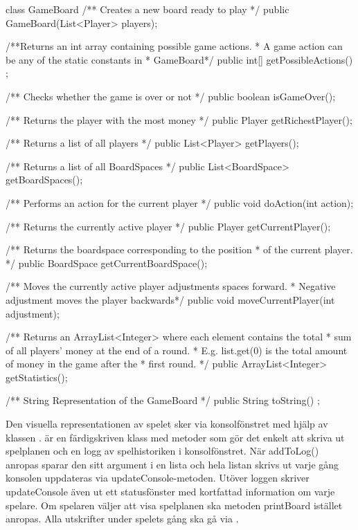 \begin{JavaSpec}{class GameBoard}
    /** Creates a new board ready to play */
    public GameBoard(List<Player> players);

    /**Returns an int array containing possible game actions.
     * A game action can be any of the static constants in
     * GameBoard*/
    public int[] getPossibleActions() ;
    
    /** Checks whether the game is over or not */
    public boolean isGameOver();
    
    /** Returns the player with the most money */
    public Player getRichestPlayer();

    /** Returns a list of all players */
    public List<Player> getPlayers();

    /** Returns a list of all BoardSpaces */
    public List<BoardSpace> getBoardSpaces();

    /** Performs an action for the current player */
    public void doAction(int action);
 
    /** Returns the currently active player */
    public Player getCurrentPlayer();

    /** Returns the boardspace corresponding to the position 
      * of the current player. */
    public BoardSpace getCurrentBoardSpace();

    /** Moves the currently active player adjustments spaces forward.
      * Negative adjustment moves the player backwards*/
    public void moveCurrentPlayer(int adjustment);
    
    /** Returns an ArrayList<Integer> where each element contains the total
      * sum of all players' money at the end of a round.
      * E.g. list.get(0) is the total amount of money in the game after the 
      * first round. */
    public ArrayList<Integer> getStatistics();

    /** String Representation of the GameBoard */
    public String toString() ;
\end{JavaSpec}


Den visuella representationen av spelet sker via konsolfönstret med hjälp av klassen .  är en färdigskriven klass med metoder som gör det enkelt att skriva ut spelplanen och en logg av spelhistoriken i konsolfönstret.
 När addToLog() anropas sparar den sitt argument i en lista och hela listan skrivs ut varje gång konsolen uppdateras via updateConsole-metoden.
Utöver loggen skriver updateConsole även ut ett statusfönster med kortfattad information om varje spelare. 
Om spelaren väljer att visa spelplanen ska metoden printBoard istället anropas.
Alla utskrifter under spelets gång ska gå via .
\newline

